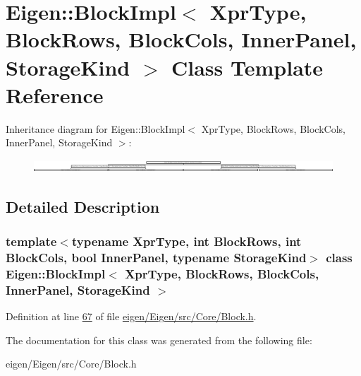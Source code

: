 \hypertarget{class_eigen_1_1_block_impl}{}\section{Eigen\+:\+:Block\+Impl$<$ Xpr\+Type, Block\+Rows, Block\+Cols, Inner\+Panel, Storage\+Kind $>$ Class Template Reference}
\label{class_eigen_1_1_block_impl}
Inheritance diagram for Eigen\+:\+:Block\+Impl$<$ Xpr\+Type, Block\+Rows, Block\+Cols, Inner\+Panel, Storage\+Kind $>$\+:\begin{figure}[H]
\begin{center}
\leavevmode
\includegraphics[height=0.475651cm]{class_eigen_1_1_block_impl}
\end{center}
\end{figure}


\subsection{Detailed Description}
\subsubsection*{template$<$typename Xpr\+Type, int Block\+Rows, int Block\+Cols, bool Inner\+Panel, typename Storage\+Kind$>$\newline
class Eigen\+::\+Block\+Impl$<$ Xpr\+Type, Block\+Rows, Block\+Cols, Inner\+Panel, Storage\+Kind $>$}



Definition at line \hyperlink{eigen_2_eigen_2src_2_core_2_block_8h_source_l00067}{67} of file \hyperlink{eigen_2_eigen_2src_2_core_2_block_8h_source}{eigen/\+Eigen/src/\+Core/\+Block.\+h}.



The documentation for this class was generated from the following file\+:\begin{DoxyCompactItemize}
\item 
eigen/\+Eigen/src/\+Core/\+Block.\+h\end{DoxyCompactItemize}
